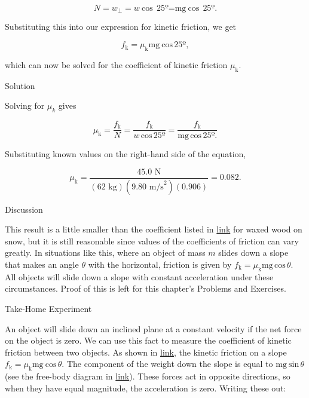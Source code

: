 \documentclass[
]{book}
\begin{document}
\leavevmode{}%
\[{{{{N = w_{\bot}} = w}\ \text{cos}\,{\text{25º} = \text{mg}\ \text{cos}}\,\text{25º}}.}{}\]

Substituting this into our expression for kinetic friction, we get

\leavevmode{}%
\[{{f_{\text{k}} = \mu_{\text{k}}}\text{mg}\ \text{cos}\,\text{25º}}{},\]

which can now be solved for the coefficient of kinetic friction
\(\mu_{\text{k}}{}\).

{Solution}

Solving for \(\mu_{k}{}\) gives

\leavevmode{}%
\[{{{\mu_{\text{k}} = \frac{f_{\text{k}}}{N}} = \frac{f_{\text{k}}}{w\,\text{cos}\,\text{25º}}} = \frac{f_{\text{k}}}{\text{mg}\,\text{cos}\,\text{25º}.}}{}\]

Substituting known values on the right-hand side of the equation,

\leavevmode{}%
\[{{{\mu_{\text{k}} = \frac{\text{45.0\ N}}{(\text{62\ kg})(9\text{.}\text{80\ m}\text{/s}^{2})(0\text{.}\text{906})}} = 0}\text{.}\text{082}.}{}\]

{Discussion}

This result is a little smaller than the coefficient listed in
\protect\hyperlink{import-auto-id1165298658126}{link} for waxed
wood on snow, but it is still reasonable since values of the
coefficients of friction can vary greatly. In situations like this,
where an object of mass \(m\) slides down a slope that makes an angle
\(\theta\) with the horizontal, friction is given by
\({{f_{\text{k}} = \mu_{\text{k}}}\text{mg}\,\text{cos}\,\theta}{}\). All
objects will slide down a slope with constant acceleration under these
circumstances. Proof of this is left for this chapter's Problems and
Exercises.

\hypertarget{fs-id1244089}{}
Take-Home Experiment

An object will slide down an inclined plane at a constant velocity if
the net force on the object is zero. We can use this fact to measure the
coefficient of kinetic friction between two objects. As shown in
\protect\hyperlink{fs-id1704828}{link}, the kinetic friction on a
slope
\({{f_{\text{k}} = \mu_{\text{k}}}\text{mg}\ \text{cos}\,\theta}{}\). The
component of the weight down the slope is equal to
\({\text{mg}\ \text{sin}\,\theta}{}\) (see the free-body diagram in
\protect\hyperlink{import-auto-id1165296217411}{link}). These
forces act in opposite directions, so when they have equal magnitude,
the acceleration is zero. Writing these out:
\end{document}
